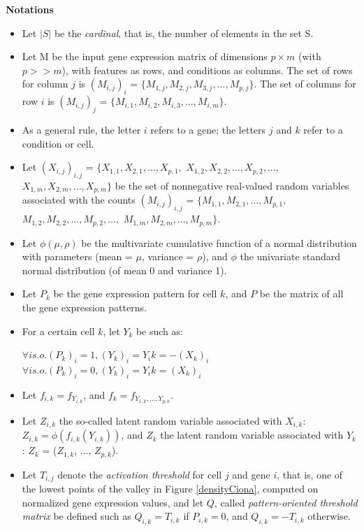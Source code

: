 \documentclass{report}
\begin{document}
\bigskip
\noindent \textbf{Notations}
\bigskip

\begin{itemize}
\item Let $|S|$ be the \textit{cardinal}, that is, the number of elements in the set S.
\item Let M be the input gene expression matrix of dimensions $p \times m$ (with $p >> m$), with features as rows, and conditions as columns. The set of rows for column $j$ is $(M_{i,j})_i$ = $\{M_{1,j}, M_{2,j}, M_{3,j}, ..., M_{p,j}\}$. The set of columns for row $i$ is $(M_{i,j})_j$ = $\{M_{i,1}, M_{i,2}, M_{i,3}, ..., M_{i,m}\}$.
\item As a general rule, the letter $i$ refers to a gene; the letters $j$ and $k$ refer to a condition or cell.
\item Let $(X_{i,j})_{i,j}$ = $\{X_{1,1}, X_{2,1}, ..., X_{p,1},$ $X_{1,2}, X_{2,2}, ..., X_{p,2}, ...,$ $X_{1,m}, X_{2,m}, ..., X_{p,m}\}$ be the set of nonnegative real-valued random variables associated with the counts $(M_{i,j})_{i,j}$ = $\{M_{1,1}, M_{2,1}, ..., M_{p,1},$ $M_{1,2}, M_{2,2}, ..., M_{p,2}, ...,$ $M_{1,m}, M_{2,m}, ..., M_{p,m}\}$. 
\item Let $\phi(\mu, \rho)$ be the multivariate cumulative function of a normal distribution with parameters (mean = $\mu$, variance = $\rho$), and $\phi$ the univariate standard normal distribution (of mean 0 and variance 1).
\item Let $P_k$ be the gene expression pattern for cell $k$, and $P$ be the matrix of all the gene expression patterns. 
\item For a certain cell $k$, let $Y_k$ be such as:

     \begin{center}
     $\forall i s.o. (P_k)_i = 1, (Y_k)_i = Y_ik = -(X_k)_i$\\
     $\forall i s.o. (P_k)_i = 0, (Y_k)_i = Y_ik = (X_k)_i$
     \end{center}

\item Let $f_{i,k} = f_{Y_{i,k}}$, and $f_k = f_{Y_{1,k}, ..., Y_{p,k}}$.
\item Let $Z_{i,k}$ the so-called latent random variable associated with $X_{i,k}$: $Z_{i,k} = \phi(f_{i,k}(Y_{i,k}))$, and $Z_k$ the latent random variable associated with $Y_k$: $Z_k$ = ($Z_{1,k}$, ..., $Z_{p,k}$).
\item Let $T_{i, j}$ denote the \textit{activation threshold} for cell $j$ and gene $i$, that is, one of the lowest points of the valley in Figure \ref{densityCiona}, computed on normalized gene expression values, and let $Q$, called \textit{pattern-oriented threshold matrix} be defined such as $Q_{i,k} = T_{i, k}$ if $P_{i,k} = 0$, and $Q_{i,k} = -T_{i, k}$ otherwise.
\end{itemize}
\end{document}
